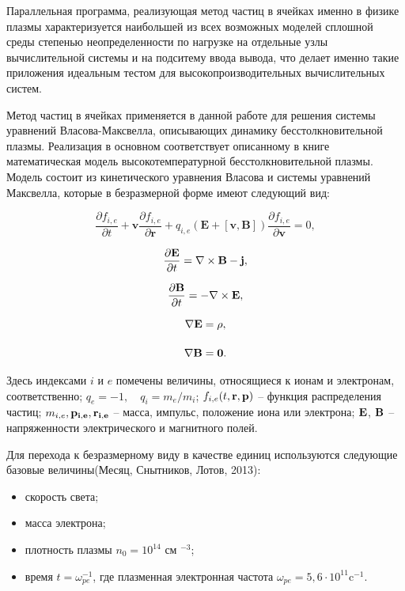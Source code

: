 Параллельная программа, реализующая  метод частиц в ячейках именно в физике плазмы характеризуется наибольшей из всех возможных моделей сплошной среды степенью неопределенности по нагрузке на отдельные узлы вычислительной системы и на подситему ввода вывода, что делает именно такие приложения идеальным тестом для высокопроизводительных вычислительных систем. 

Метод частиц в ячейках применяется в данной работе для решения системы уравнений Власова-Максвелла, описывающих динамику бесстолкновительной плазмы.
Реализация в основном соответствует описанному в книге \cite{VshivkovPICbook}
математическая модель высокотемпературной бесстолкновительной плазмы.
Модель состоит из кинетического уравнения Власова и системы
уравнений Максвелла, которые в безразмерной форме имеют
следующий вид:

\begin{equation}\label{eq:Vlas}
\frac{\partial f_{i,e}}{\partial t}+{\textbf{v}} \frac{\partial f_{i,e}}{\partial \textbf{r}}+q_{i,e}({\textbf{E}}+[{\textbf{v}},{\textbf{B}}])\frac{\partial f_{i,e}}{\partial \textbf{v}}=0, 
\end{equation}

\begin{equation}
\begin{array}{c}\displaystyle

\frac{\partial \textbf{E}}{\partial t}=\nabla\times \textbf{B} - \bf{j},  \label{eq:dE}
\\[5mm]\displaystyle
\frac{\partial \textbf{B}}{\partial t}=-\nabla\times \textbf{E},  \label{eq:dB}
\\[5mm]\displaystyle
\nabla \bf{E} = \rho, \label{eq:divE}
\\[5mm]\displaystyle
\nabla \bf{B} = 0.  \label{eq:divB}

\end{array}
\end{equation}

Здесь индексами $i$ и $e$ помечены величины, относящиеся к ионам и
электронам, со\-от\-ветст\-вен\-но; $q_e=-1, \quad q_i=m_e/m_i$; $f_{i,e}(t,\bf{r},\bf{p})$ --
функция распределения частиц; $m_{i,e}, \bf{p}_{i,e},
\bf{r}_{i,e}$ -- масса, импульс, положение иона или электрона;
$\bf{E}$, $\bf{B}$ -- напряженности электрического и магнитного
полей. 

Для перехода к безразмерному виду в качестве единиц
используются следующие базовые величины(Месяц, Снытников, Лотов, 2013):
\begin{itemize}
	\item скорость света;
	\item масса электрона;
	\item плотность плазмы $n_0=10^{14}$ см $^{-3}$;
	\item время $t=\omega _{pe}^{-1}$, где плазменная электронная частота $\omega_{pe} =5,6 \cdot 10^{11}$c$^{-1}$.
\end{itemize}

